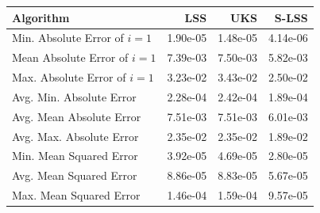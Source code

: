 \begin{tabular}{lrrr}
\toprule
Algorithm & LSS & UKS & S-LSS \\
\midrule
Min. Absolute Error of $i=1$ & 1.90e-05 & 1.48e-05 & 4.14e-06 \\
Mean Absolute Error of $i=1$ & 7.39e-03 & 7.50e-03 & 5.82e-03 \\
Max. Absolute Error of $i=1$ & 3.23e-02 & 3.43e-02 & 2.50e-02 \\
\midrule
Avg. Min. Absolute Error & 2.28e-04 & 2.42e-04 & 1.89e-04 \\
Avg. Mean Absolute Error & 7.51e-03 & 7.51e-03 & 6.01e-03 \\
Avg. Max. Absolute Error & 2.35e-02 & 2.35e-02 & 1.89e-02 \\
\midrule
Min. Mean Squared Error & 3.92e-05 & 4.69e-05 & 2.80e-05 \\
Avg. Mean Squared Error & 8.86e-05 & 8.83e-05 & 5.67e-05 \\
Max. Mean Squared Error & 1.46e-04 & 1.59e-04 & 9.57e-05 \\
\bottomrule
\end{tabular}
